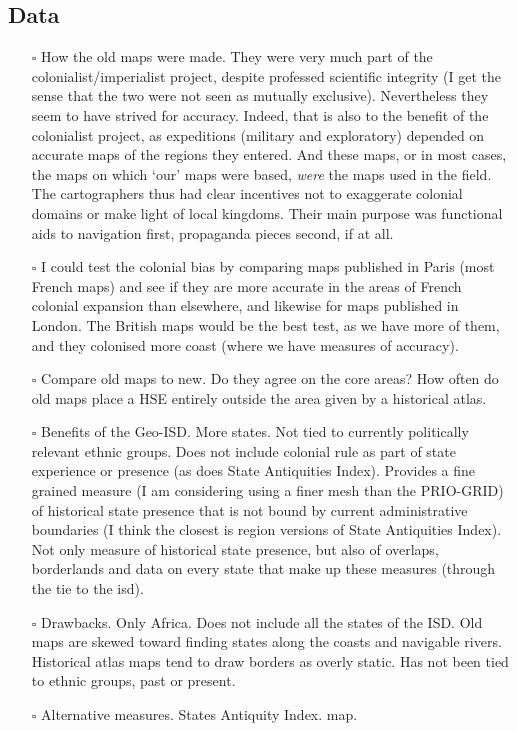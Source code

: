 \documentclass[12pt]{article}
\begin{document}
\subsection{Data} \begin{itemize} \item[$\square$] How the old maps were made.
	They were very much part of the colonialist/imperialist project, despite
	professed scientific integrity (I get the sense that the two were not
	seen as mutually exclusive). Nevertheless they seem to have strived for
	accuracy. Indeed, that is also to the benefit of the colonialist
	project, as expeditions (military and exploratory) depended on accurate
	maps of the regions they entered. And these maps, or in most cases, the
	maps on which `our' maps were based, \emph{were} the maps used in the
	field. The cartographers thus had clear incentives not to exaggerate
	colonial domains or make light of local kingdoms. Their main purpose was
	functional aids to navigation first, propaganda pieces second, if at
	all.

		\item[$\square$] I could test the colonial bias by comparing
			maps published in Paris (most French maps) and see if
			they are more accurate in the areas of French colonial
			expansion than elsewhere, and likewise for maps
			published in London. The British maps would be the best
			test, as we have more of them, and they colonised more
			coast (where we have measures of accuracy).

	\item[$\square$] Compare old maps to new. Do they agree on the core
		areas? How often do old maps place a HSE entirely outside the
		area given by a historical atlas.

	\item[$\square$] Benefits of the Geo-ISD. More states. Not tied to
		currently politically relevant ethnic groups. Does not include
		colonial rule as part of state experience or presence (as does
		State Antiquities Index). Provides a fine grained measure (I am
		considering using a finer mesh than the PRIO-GRID) of historical
		state presence that is not bound by current administrative
		boundaries (I think the closest is region versions of State
		Antiquities Index). Not only measure of historical state
		presence, but also of overlaps, borderlands and data on every
		state that make up these measures (through the tie to the isd).

	\item[$\square$] Drawbacks. Only Africa. Does not include all the states
		of the ISD. Old maps are skewed toward finding states along the
		coasts and navigable rivers. Historical atlas maps tend to draw
		borders as overly static. Has not been tied to ethnic groups,
		past or present.

	\item[$\square$] Alternative measures. States Antiquity Index.
		\citet{Murdock1967} map.
\end{itemize}
\end{document}

